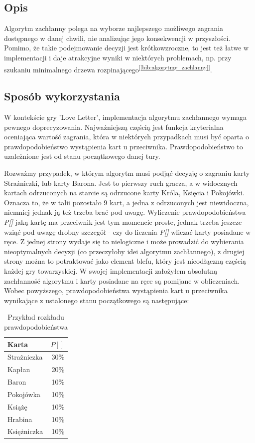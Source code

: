\subsection{Opis}
Algorytm zachłanny polega na wyborze najlepszego możliwego zagrania dostępnego w danej chwili, nie analizując jego konsekwencji w przyszłości. Pomimo, że takie podejmowanie decyzji jest krótkowzroczne, to jest też łatwe w implementacji i daje atrakcyjne wyniki w niektórych problemach, np. przy szukaniu minimalnego drzewa rozpinającego\textsuperscript{[\ref{bib:algorytmy_zachlanny}]}.

\subsection{Sposób wykorzystania}

W kontekście gry 'Love Letter', implementacja algorytmu zachłannego wymaga pewnego doprecyzowania. Najważniejszą częścią jest funkcja kryterialna oceniająca wartość zagrania, która w niektórych przypadkach musi być oparta o prawdopodobieństwo wystąpienia kart u przeciwnika. Prawdopodobieństwo to uzależnione jest od stanu początkowego danej tury.

Rozważmy przypadek, w którym algorytm musi podjąć decyzję o zagraniu karty Strażniczki, lub karty Barona. Jest to pierwszy ruch gracza, a w widocznych kartach odrzuconych na starcie są odrzucone karty Króla, Księcia i Pokojówki. Oznacza to, że w talii pozostało 9 kart, a jedna z odrzuconych jest niewidoczna, niemniej jednak ją też trzeba brać pod uwagę. Wyliczenie prawdopodobieństwa \textit{P[]} jaką kartę ma przeciwnik jest tym momencie proste, jednak trzeba jeszcze wziąć pod uwagę drobny szczegół - czy do liczenia \textit{P[]} wliczać karty posiadane w ręce. Z jednej strony wydaje się to nielogiczne i może prowadzić do wybierania nieoptymalnych decyzji (co przeczyłoby idei algorytmu zachłannego), z drugiej strony można to potraktować jako element blefu, który jest nieodłączną częścią każdej gry towarzyskiej. W swojej implementacji założyłem absolutną zachłanność algorytmu i karty posiadane na ręce są pomijane w obliczeniach. 
Wobec powyższego, prawdopodobieństwa wystąpienia kart u przeciwnika wynikające z ustalonego stanu początkowego są następujące:

\begin{table}[h]
	\caption{Przykład rozkładu prawdopodobieństwa}
	\centering
		\begin{tabular}{|l|r|}
			\hline
			\bf{Karta} & $P[]$	\\ \hline
			Strażniczka & 30\% 			\\ \hline
			Kapłan & 20\% 				\\ \hline
			Baron & 10\% 				\\ \hline
			Pokojówka & 10\% 			\\ \hline
			Książę & 10\% 				\\ \hline
			Hrabina & 10\% 				\\ \hline
			Księżniczka & 10\% 			\\ \hline
		\end{tabular}
\end{table}

